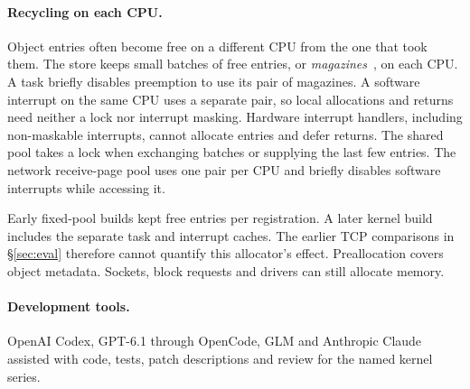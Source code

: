 \paragraph{Recycling on each CPU.} Object entries often become free on a different
CPU from the one that took them. The store keeps small batches of free entries,
or \emph{magazines}~\cite{magazines}, on each CPU. A task briefly disables
preemption to use its pair of magazines. A software interrupt on the same CPU
uses a separate pair, so local allocations and returns need neither a lock nor
interrupt masking. Hardware interrupt handlers, including non-maskable interrupts,
cannot allocate entries and defer returns.
The shared pool takes a lock when exchanging batches or supplying the last few
entries. The network receive-page pool uses one pair per CPU and briefly disables
software interrupts while accessing it.

Early fixed-pool builds kept free entries per registration. A later kernel build
includes the separate task and interrupt caches. The earlier TCP comparisons in
\S\ref{sec:eval} therefore cannot quantify this allocator's effect. Preallocation
covers object metadata. Sockets, block requests and drivers can still allocate
memory.

\paragraph{Development tools.} OpenAI Codex, GPT-6.1 through OpenCode, GLM and
Anthropic Claude assisted with code, tests, patch descriptions and review for the
named kernel series.
